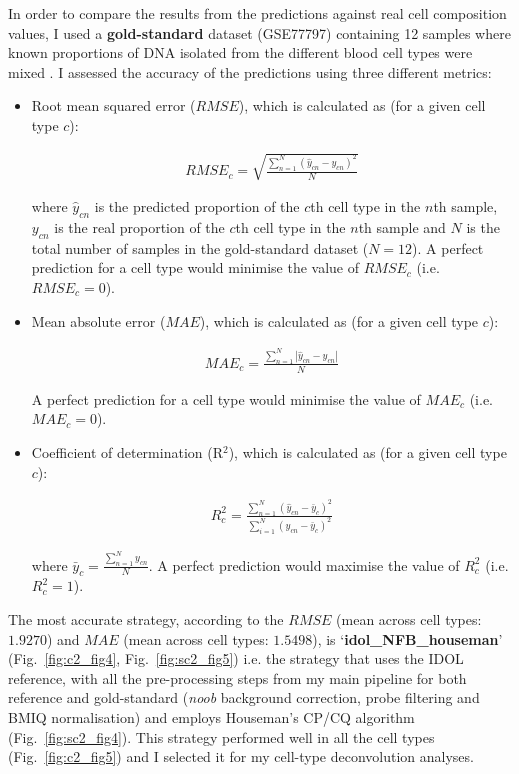 In order to compare the results from the predictions against real cell composition values, I used a \textbf{gold-standard} dataset (GSE77797) containing 12 samples where known proportions of DNA isolated from the different blood cell types were mixed \citep{Koestler2016}. I assessed the accuracy of the predictions using three different metrics:

\begin{itemize}
	
	\item Root mean squared error ($RMSE$), which is calculated as (for a given cell type $c$):
	
	\begin{align}
	RMSE_c = \sqrt{\frac{\sum_{n=1}^{N} (\hat{y}_{cn} - y_{cn})^2}{N}}
	\end{align}
	
	where $\hat{y}_{cn}$ is the predicted proportion of the $c$th cell type in the $n$th sample, $y_{cn}$ is the real proportion of the $c$th cell type in the $n$th sample and $N$ is the total number of samples in the gold-standard dataset ($N=12$). A perfect prediction for a cell type would minimise the value of $RMSE_c$ (i.e. $RMSE_c = 0$).
	
	\item Mean absolute error ($MAE$), which is calculated as (for a given cell type $c$):
	
	\begin{align}
	MAE_c = \frac{\sum_{n=1}^{N} |\hat{y}_{cn} - y_{cn}|}{N}
	\end{align}
	
	A perfect prediction for a cell type would minimise the value of $MAE_c$ (i.e. $MAE_c = 0$).
	
	\item Coefficient of determination (R$^2$), which is calculated as (for a given cell type $c$):
	
	\begin{align}
	R^2_c = \frac{\sum_{n=1}^{N} (\hat{y}_{cn} - \bar{y}_c)^2}{\sum_{i=1}^{N} (y_{cn} - \bar{y}_c)^2}
	\end{align}
	
	where $\bar{y}_c = \frac{\sum_{n=1}^{N} y_{cn}}{N}$. A perfect prediction would maximise the value of $R^2_c$ (i.e. $R^2_c=1$).
	
\end{itemize}


The most accurate strategy, according to the $RMSE$ (mean across cell types: $1.9270$) and $MAE$ (mean across cell types: $1.5498$), is `\textbf{idol\_NFB\_houseman}' (Fig.~\ref{fig:c2_fig4}, Fig.~\ref{fig:sc2_fig5}) i.e. the strategy that uses the IDOL reference, with all the pre-processing steps from my main pipeline for both reference and gold-standard (\textit{noob} background correction, probe filtering and BMIQ normalisation) and employs Houseman's CP/CQ algorithm (Fig.~\ref{fig:sc2_fig4}). This strategy performed well in all the cell types (Fig.~\ref{fig:c2_fig5}) and I selected it for my cell-type deconvolution analyses. 


